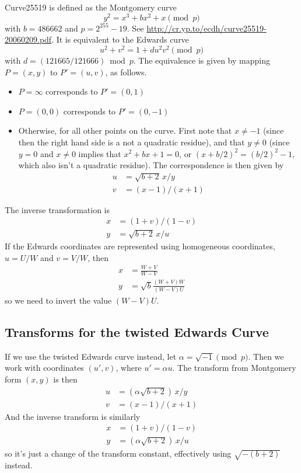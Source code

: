 \documentclass[a4paper]{article}
\begin{document}
Curve25519 is defined as the Montgomery curve
\begin{equation*}
  y^2 = x^3 + b x^2 + x \pmod p
\end{equation*}
with $b = 486662$ and $p = 2^{255} -19$. See
\url{http://cr.yp.to/ecdh/curve25519-20060209.pdf}. It is equivalent
to the Edwards curve
\begin{equation*}
  u^2 + v^2 = 1 + d u^2 v^2 \pmod p
\end{equation*}
with $d = (121665/121666) \bmod p$. The equivalence is given by
mapping $P = (x,y)$ to $P' = (u, v)$, as follows.
\begin{itemize}
\item $P = \infty$ corresponds to $P' = (0, 1)$
\item $P = (0, 0)$ corresponds to $P' = (0, -1)$
\item Otherwise, for all other points on the curve. First note that $x
  \neq -1$ (since then the right hand side is a not a quadratic
  residue), and that $y \neq 0$ (since $y = 0$ and $x \neq 0$ implies
  that $x^2 + bx + 1 = 0$, or $(x + b/2)^2 = (b/2)^2 - 1$, which also
  isn't a quadratic residue). The correspondence is then given by
  \begin{align*}
    u &= \sqrt{b+2} \, x / y \\
    v &= (x-1) / (x+1)
  \end{align*}
\end{itemize}

The inverse transformation is
\begin{align*}
  x &= (1+v) / (1-v) \\
  y &= \sqrt{b+2} \, x / u 
\end{align*}
If the Edwards coordinates are represented using homogeneous
coordinates, $u = U/W$ and $v = V/W$, then
\begin{align*}
  x &= \frac{W+V}{W-V} \\
  y &= \sqrt{b} \frac{(W+V) W}{(W-V) U} 
\end{align*}
so we need to invert the value $(W-V) U$.

\subsection{Transforms for the twisted Edwards Curve}

If we use the twisted Edwards curve instead, let $\alpha = \sqrt{-1}
\pmod{p}$. Then we work with coordinates $(u', v)$, where $u' = \alpha
u$. The transform from Montgomery form $(x, y)$ is then
\begin{align*}
  u &= (\alpha \sqrt{b+2}) \, x / y\\
  v &= (x-1) / (x+1)
\end{align*}
And the inverse transform is similarly
\begin{align*}
  x &= (1+v) / (1-v) \\
  y &= (\alpha \sqrt{b+2}) \, x / u 
\end{align*}
so it's just a change of the transform constant, effectively using
$\sqrt{-(b+2)}$ instead.
\end{document}
